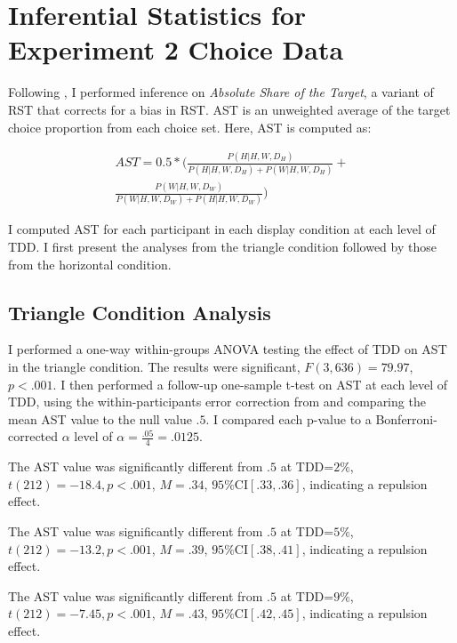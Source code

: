 \chapter{Inferential Statistics for Experiment 2 Choice Data}

Following \textcite{katsimpokisRobustBayesianTest2022}, I performed inference on \textit{Absolute Share of the Target}, a variant of RST that corrects for a bias in RST. AST is an unweighted average of the target choice proportion from each choice set. Here, AST is computed as:

\begin{equation}
    \begin{aligned}
        AST=0.5*(\frac{P(H|{H,W,D_{H}})}{P(H|{H,W,D_{H}})+P(W|{H,W,D_{H}})}+ \\
        \frac{P(W|{H,W,D_{W}})}{P(W|{H,W,D_{W}})+P(H|{H,W,D_{W}})})
    \end{aligned}
\end{equation}

I computed AST for each participant in each display condition at each level of TDD. I first present the analyses from the triangle condition followed by those from the horizontal condition. 

\section{Triangle Condition Analysis}
I performed a one-way within-groups ANOVA testing the effect of TDD on AST in the triangle condition. The results were significant, $\textit{F}(3,636)=79.97$,$\textit{p}<.001$. 
I then performed a follow-up one-sample t-test on AST at each level of TDD, using the within-participants error correction from \textcite{cousineau2014error} and comparing the mean AST value to the null value $.5$. I compared each p-value to a Bonferroni-corrected $\alpha$ level of $\alpha=\frac{.05}{4}=.0125$. 

The AST value was significantly different from $.5$ at TDD=$2\%$, $\textit{t}(212)=-18.4,\textit{p}<.001$, $\textit{M}=.34$, $95\%\text{CI}[.33,.36]$, indicating a repulsion effect. 

The AST value was significantly different from $.5$ at TDD=$5\%$, $\textit{t}(212)=-13.2,\textit{p}<.001$, $\textit{M}=.39$, $95\%\text{CI}[.38,.41]$, indicating a repulsion effect. 

The AST value was significantly different from $.5$ at TDD=$9\%$, $\textit{t}(212)=-7.45,\textit{p}<.001$, $\textit{M}=.43$, $95\%\text{CI}[.42,.45]$, indicating a repulsion effect. 

